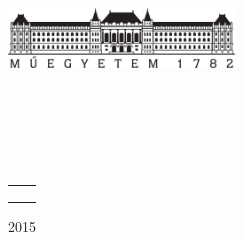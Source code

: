 \begin{titlepage}
\begin{center}
\includegraphics[width=60mm,keepaspectratio]{figures/bme_logo.pdf}\\
\vspace{0.3cm}
\textbf{\bme}\\
\textmd{\vik}\\
\textmd{\viktanszek}\\[5cm]

\vspace{0.4cm}
{\huge \bfseries \vikcim}\\[0.8cm]
\vspace{0.5cm}
\textsc{\Large \vikdoktipus}\\[4cm]

{
	\renewcommand{\arraystretch}{0.85}
	\begin{tabular}{cc}
	 \makebox[7cm]{\emph{\keszitette}} & \makebox[7cm]{\emph{\konzulens}} \\ \noalign{\smallskip}
	 \makebox[7cm]{\szerzo} & \makebox[7cm]{\vikkonzulensA} \\
	  & \makebox[7cm]{\vikkonzulensB} \\
	\end{tabular}
}

\vfill
{\large 2015}
\end{center}
\end{titlepage}


